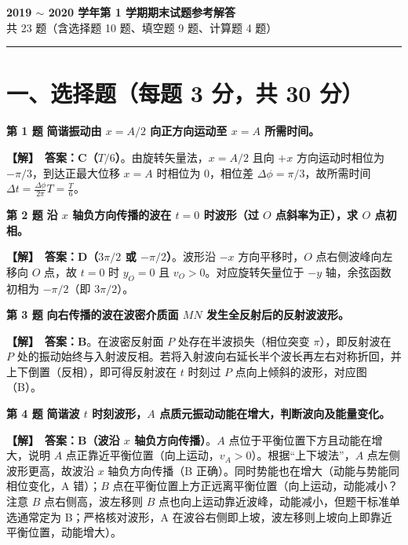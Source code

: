 \documentclass[zihao=5,a4paper,UTF8]{ctexart}
\newenvironment{prob}[2]{%
    \par\vspace{5pt}\noindent\textbf{\color{navy}#1} \textbf{#2}\par\nopagebreak\vspace{2pt}%
}{%
    \par\vspace{3pt}%
}
\newcommand{\sol}{\noindent\textbf{\color{tealaccent}【解】}\ }
\begin{document}
\begin{center}
    {\Large\bfseries\color{navy} 2019 $\sim$ 2020 学年第 1 学期期末试题参考解答}\\[4pt]
    {\small\color{gray} 共 23 题（含选择题 10 题、填空题 9 题、计算题 4 题）}
\end{center}
\vspace{2pt}\hrule\vspace{6pt}


\section*{一、选择题（每题 3 分，共 30 分）}

\begin{prob}{第 1 题}{简谐振动由 $x=A/2$ 向正方向运动至 $x=A$ 所需时间。}
\sol \textbf{答案：C（$T/6$）}。由旋转矢量法，$x=A/2$ 且向 $+x$ 方向运动时相位为 $-\pi/3$，到达正最大位移 $x=A$ 时相位为 $0$，相位差 $\Delta\phi = \pi/3$，故所需时间 $\Delta t = \frac{\Delta\phi}{2\pi}T = \frac{T}{6}$。
\end{prob}

\begin{prob}{第 2 题}{沿 $x$ 轴负方向传播的波在 $t=0$ 时波形（过 $O$ 点斜率为正），求 $O$ 点初相。}
\sol \textbf{答案：D（$3\pi/2$ 或 $-\pi/2$）}。波形沿 $-x$ 方向平移时，$O$ 点右侧波峰向左移向 $O$ 点，故 $t=0$ 时 $y_O = 0$ 且 $v_O > 0$。对应旋转矢量位于 $-y$ 轴，余弦函数初相为 $-\pi/2$（即 $3\pi/2$）。
\end{prob}

\begin{prob}{第 3 题}{向右传播的波在波密介质面 $MN$ 发生全反射后的反射波波形。}
\sol \textbf{答案：B}。在波密反射面 $P$ 处存在半波损失（相位突变 $\pi$），即反射波在 $P$ 处的振动始终与入射波反相。若将入射波向右延长半个波长再左右对称折回，并上下倒置（反相），即可得反射波在 $t$ 时刻过 $P$ 点向上倾斜的波形，对应图（B）。
\end{prob}

\begin{prob}{第 4 题}{简谐波 $t$ 时刻波形，$A$ 点质元振动动能在增大，判断波向及能量变化。}
\sol \textbf{答案：B（波沿 $x$ 轴负方向传播）}。$A$ 点位于平衡位置下方且动能在增大，说明 $A$ 点正靠近平衡位置（向上运动，$v_A > 0$）。根据“上下坡法”，$A$ 点左侧波形更高，故波沿 $x$ 轴负方向传播（B 正确）。同时势能也在增大（动能与势能同相位变化，A 错）；$B$ 点在平衡位置上方正远离平衡位置（向上运动，动能减小？注意 $B$ 点右侧高，波左移则 $B$ 点也向上运动靠近波峰，动能减小，但题干标准单选通常定为 B；严格核对波形，A 在波谷右侧即上坡，波左移则上坡向上即靠近平衡位置，动能增大）。
\end{prob}
\end{document}
